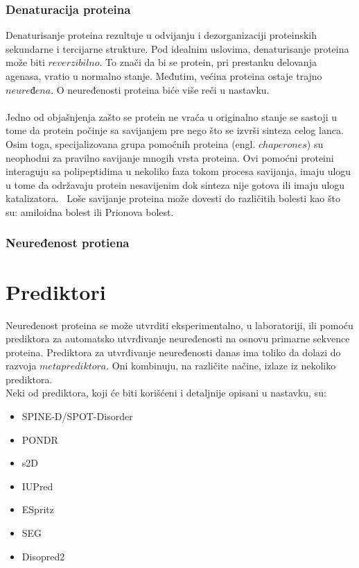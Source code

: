 \documentclass[a4paper]{article}
\begin{document}
\subsubsection{Denaturacija proteina}
Denaturisanje proteina rezultuje u odvijanju i dezorganizaciji proteinskih sekundarne i tercijarne strukture. Pod idealnim uslovima, denaturisanje proteina može biti $reverzibilno$. To znači da bi se protein, pri prestanku delovanja agenasa, vratio u normalno stanje. Međutim, većina proteina ostaje trajno $neuređena$. O neuređenosti proteina biće više reči u nastavku.\\\\
Jedno od objašnjenja zašto se protein ne vraća u originalno stanje se sastoji u tome da protein počinje sa savijanjem pre nego što se izvrši sinteza celog lanca. Osim toga, specijalizovana grupa pomoćnih proteina (engl. $chaperones$) su neophodni za pravilno savijanje mnogih vrsta proteina. Ovi pomoćni proteini interaguju sa polipeptidima u nekoliko faza tokom procesa savijanja, imaju ulogu u tome da održavaju protein nesavijenim dok sinteza nije gotova ili imaju ulogu katalizatora.~\cite{lippincott} Loše savijanje proteina može dovesti do različitih bolesti kao što su: amiloidna bolest ili Prionova bolest.

\subsubsection{Neuređenost protiena}


\section{Prediktori}
\label{sec:prediktori}

Neuređenost proteina se može utvrditi eksperimentalno, u laboratoriji, ili pomoću prediktora za automatsko utvrđivanje neuređenosti na osnovu primarne sekvence proteina. Prediktora za utvrđivanje neuređenosti danas ima toliko da dolazi do razvoja $metaprediktora$. Oni kombinuju, na različite načine, izlaze iz nekoliko prediktora. \\

Neki od prediktora, koji će biti korišćeni i detaljnije opisani u nastavku, su:
\begin{itemize}
\item SPINE-D/SPOT-Disorder
\item PONDR
\item s2D
\item IUPred
\item ESpritz
\item SEG
\item Disopred2
\end{itemize}
\end{document}
